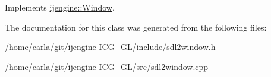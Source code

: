 Implements \hyperlink{classijengine_1_1Window_a0481e6a3e12e4455cbc7205bcb7507de}{ijengine\-::\-Window}.



The documentation for this class was generated from the following files\-:\begin{DoxyCompactItemize}
\item 
/home/carla/git/ijengine-\/\-I\-C\-G\-\_\-\-G\-L/include/\hyperlink{sdl2window_8h}{sdl2window.\-h}\item 
/home/carla/git/ijengine-\/\-I\-C\-G\-\_\-\-G\-L/src/\hyperlink{sdl2window_8cpp}{sdl2window.\-cpp}\end{DoxyCompactItemize}

